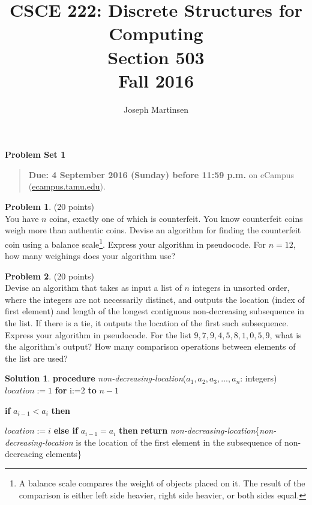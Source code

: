 \documentclass{article}
\title{CSCE 222: Discrete Structures for Computing\\Section 503\\Fall 2016}
\author{Joseph Martinsen}
\theoremstyle{definition}
\newtheorem{problem}{Problem}
\newtheorem*{solution}{Solution}
\newcommand{\problemset}[1]{\begin{center}\textbf{Problem Set #1}\end{center}}
\newcommand{\duedate}[1]{\begin{quote}\textbf{Due: #1} on eCampus (\url{ecampus.tamu.edu}).\end{quote}}
\begin{document}
\maketitle

\problemset{1}

\duedate{4 September 2016 (Sunday) before 11:59 p.m.}

\bigskip

\begin{problem} (20 points)\\
You have $n$ coins, exactly one of which is counterfeit.  You know counterfeit coins weigh more than authentic coins.  Devise an algorithm for finding the counterfeit coin using a balance scale\footnote{A balance scale compares the weight of objects placed on it.  The result of the comparison is either left side heavier, right side heavier, or both sides equal.}.  Express your algorithm in pseudocode.  For $n=12$, how many weighings does your algorithm use? 
\end{problem}


\newpage

\begin{problem} (20 points)\\
Devise an algorithm that takes as input a list of $n$ integers in unsorted order, where the integers are not necessarily distinct, and outputs the location (index of first element) and length of the longest contiguous non-decreasing subsequence in the list.  If there is a tie, it outputs the location of the first such subsequence.  Express your algorithm in pseudocode.  For the list $9,7,9,4,5,8,1,0,5,9$, what is the algorithm's output? How many comparison operations between elements of the list are used?
\end{problem}

\begin{solution}
\item
\textbf{procedure} \textit{non-decreasing-location}(\textit{$a_1, a_2, a_3,...,a_n$}: integers)\newline
$location:=1$\newline
\textbf{for} i:=$2$ \textbf{to} $n-1$\par
	\textbf{if} $a_{i-1} < a_i$ \textbf{then}\par
    	$location:=i$\newline
        \textbf{else if} $a_{i-1} = a_i$ \textbf{then}\newline
        \textbf{return} \textit{non-decreasing-location}\{\textit{non-decreasing-location} is the location of the first element in the subsequence of non-decreacing elements\}

\end{solution}
\end{document}
